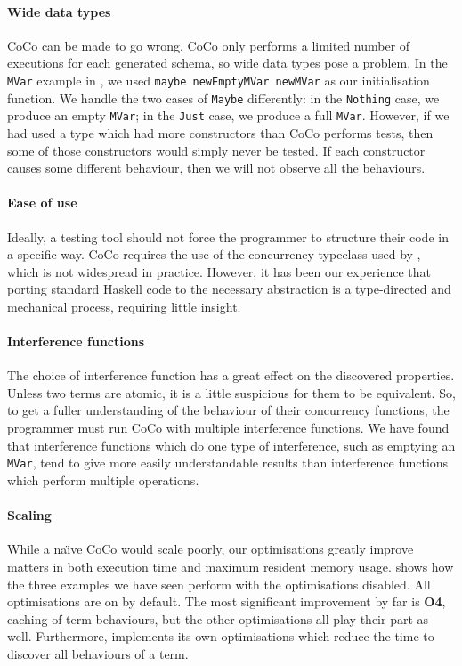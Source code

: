 \paragraph{Wide data types}
CoCo can be made to go wrong.  CoCo only performs a limited number of
executions for each generated schema, so wide data types pose a
problem.  In the \verb|MVar| example in , we
used \verb|maybe newEmptyMVar newMVar| as our initialisation function.
We handle the two cases of \verb|Maybe| differently: in the
\verb|Nothing| case, we produce an empty \verb|MVar|; in the
\verb|Just| case, we produce a full \verb|MVar|.  However, if we had
used a type which had more constructors than CoCo performs tests, then
some of those constructors would simply never be tested.  If each
constructor causes some different behaviour, then we will not observe
all the behaviours.

\paragraph{Ease of use}
Ideally, a testing tool should not force the programmer to structure
their code in a specific way.  CoCo requires the use of the
concurrency typeclass used by \dejafu{}, which is not widespread in
practice.  However, it has been our experience that porting standard
Haskell code to the necessary abstraction is a type-directed and
mechanical process, requiring little insight.

\paragraph{Interference functions}
The choice of interference function has a great effect on the
discovered properties.  Unless two terms are atomic, it is a little
suspicious for them to be equivalent.  So, to get a fuller
understanding of the behaviour of their concurrency functions, the
programmer must run CoCo with multiple interference functions.  We
have found that interference functions which do one type of
interference, such as emptying an \verb|MVar|, tend to give more
easily understandable results than interference functions which
perform multiple operations.

\paragraph{Scaling}
While a na\"{\i}ve CoCo would scale poorly, our optimisations greatly
improve matters in both execution time and maximum resident memory
usage.   shows how the three examples we have
seen perform with the optimisations disabled.  All optimisations are
on by default.  The most significant improvement by far is
\textbf{O4}, caching of term behaviours, but the other optimisations
all play their part as well.  Furthermore, \dejafu{} implements its
own optimisations which reduce the time to discover all behaviours of
a term.


